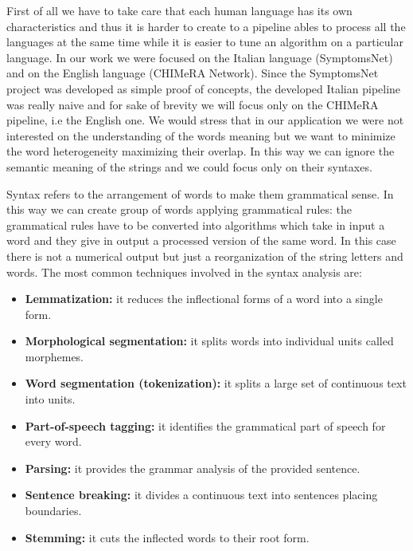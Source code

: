 \documentclass{standalone}
\begin{document}
First of all we have to take care that each human language has its own characteristics and thus it is harder to create to a pipeline ables to process all the languages at the same time while it is easier to tune an algorithm on a particular language.
In our work we were focused on the Italian language (\textsf{SymptomsNet}) and on the English language (\textsf{CHIMeRA} Network).
Since the \textsf{SymptomsNet} project was developed as simple proof of concepts, the developed Italian pipeline was really naive and for sake of brevity we will focus only on the \textsf{CHIMeRA} pipeline, i.e the English one.
We would stress that in our application we were not interested on the understanding of the words meaning but we want to minimize the word heterogeneity maximizing their overlap.
In this way we can ignore the semantic meaning of the strings and we could focus only on their syntaxes.

Syntax refers to the arrangement of words to make them grammatical sense.
In this way we can create group of words applying grammatical rules: the grammatical rules have to be converted into algorithms which take in input a word and they give in output a processed version of the same word.
In this case there is not a numerical output but just a reorganization of the string letters and words.
The most common techniques involved in the syntax analysis are:

\begin{itemize}

  \item \textbf{Lemmatization:} it reduces the inflectional forms of a word into a single form.
  \item \textbf{Morphological segmentation:} it splits words into individual units called morphemes.
  \item \textbf{Word segmentation (tokenization):} it splits a large set of continuous text into units.
  \item \textbf{Part-of-speech tagging:} it identifies the grammatical part of speech for every word.
  \item \textbf{Parsing:} it provides the grammar analysis of the provided sentence.
  \item \textbf{Sentence breaking:} it divides a continuous text into sentences placing boundaries.
  \item \textbf{Stemming:} it cuts the inflected words to their root form.

\end{itemize}
\end{document}
